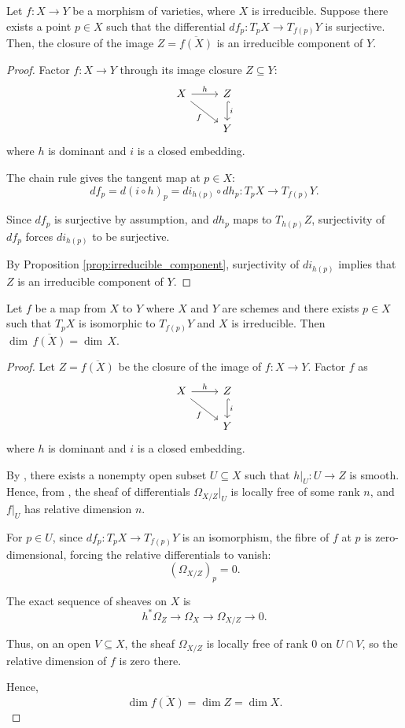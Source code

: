 \documentclass{amsart}
\begin{document}
\begin{proposition}\label{prop:image_irreducible}
Let \( f: X \to Y \) be a morphism of varieties, where \( X \) is irreducible. Suppose there exists a point \( p \in X \) such that the differential $d f_p : T_p X \to T_{f(p)} Y$ is surjective. Then, the closure of the image \( Z = \overline{f(X)} \) is an irreducible component of \( Y \).
\end{proposition}
\begin{proof} 
Factor \( f: X \to Y \) through its image closure \( Z \subseteq Y \):
\[
\begin{tikzcd}
X \arrow[r, "h"] \arrow[dr, "f"'] & Z \arrow[d, "i", hook] \\
& Y
\end{tikzcd}
\]
where \( h \) is dominant and \( i \) is a closed embedding.

The chain rule gives the tangent map at \( p \in X \):
\[
df_p = d(i \circ h)_p = di_{h(p)} \circ dh_p : T_p X \to T_{f(p)} Y.
\]

Since \( df_p \) is surjective by assumption, and \( dh_p \) maps to \( T_{h(p)} Z \), surjectivity of \( df_p \) forces \( di_{h(p)} \) to be surjective.

By Proposition \ref{prop:irreducible_component}, surjectivity of \( di_{h(p)} \) implies that \( Z \) is an irreducible component of \( Y \).

\end{proof}
\begin{proposition}
Let \( f \) be a map from \( X \) to \( Y \) where \( X \) and \( Y \) are schemes and there exists \( p \in X \) such that \( T_pX \) is isomorphic to \( T_{f(p)}Y \) and \( X \) is irreducible. Then $\dim \, \overline{f(X)} = \dim \, X.$
\end{proposition}
\begin{proof}
    Let \( Z = \overline{f(X)} \) be the closure of the image of \( f: X \to Y \). Factor \( f \) as
\[
\begin{tikzcd}
X \arrow[r, "h"] \arrow[dr, "f"'] & Z \arrow[d, "i", hook] \\
& Y
\end{tikzcd}
\]
where \( h \) is dominant and \( i \) is a closed embedding.

By \cite[Lemma 10.5]{H}, there exists a nonempty open subset \( U \subseteq X \) such that \( h|_U : U \to Z \) is smooth. Hence, from \cite[Tag 02G1]{stacks-project}, the sheaf of differentials \(\Omega_{X/Z}|_U\) is locally free of some rank \( n \), and \( f|_U \) has relative dimension \( n \).

For \( p \in U \), since \( df_p: T_pX \to T_{f(p)}Y \) is an isomorphism, the fibre of \( f \) at \( p \) is zero-dimensional, forcing the relative differentials to vanish:
\[
(\Omega_{X/Z})_p = 0.
\]

The exact sequence of sheaves on \( X \) is
\[
h^* \Omega_Z \to \Omega_X \to \Omega_{X/Z} \to 0.
\]

Thus, on an open \( V \subseteq X \), the sheaf \( \Omega_{X/Z} \) is locally free of rank 0 on \( U \cap V \), so the relative dimension of \( f \) is zero there.

Hence,
\[
\dim \overline{f(X)} = \dim Z = \dim X.
\]
\end{proof}
\end{document}
